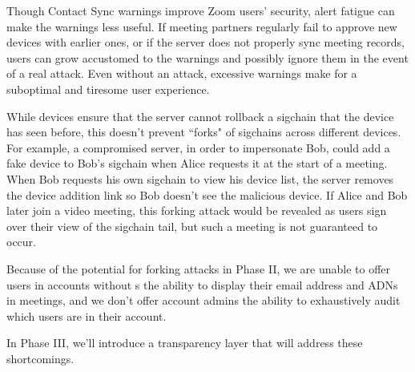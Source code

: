 Though Contact Sync warnings improve Zoom users' security, alert fatigue can make the warnings less
useful. If meeting partners regularly fail to approve new devices with earlier ones, or if the
server does not properly sync meeting records, users can grow accustomed to the warnings and possibly
ignore them in the event of a real attack. Even without an attack, excessive warnings make for a
suboptimal and tiresome user experience.

While devices ensure that the server cannot rollback a sigchain that the device has seen before,
this doesn't prevent ``forks" of sigchains across different devices. For example, a compromised
server, in order to impersonate Bob, could add a fake device to Bob's sigchain when Alice requests
it at the start of a meeting. When Bob requests his own sigchain to view his device list, the server
removes the device addition link so Bob doesn't see the malicious device. If Alice and Bob later
join a video meeting, this forking attack would be revealed as users sign over their view of the
sigchain tail, but such a meeting is not guaranteed to occur.

Because of the potential for forking attacks in Phase II, we are unable to offer users in accounts
without {\idp}s the ability to display their email address and ADNs in meetings, and we don't offer
account admins the ability to exhaustively audit which users are in their account.

In Phase III, we'll introduce a transparency layer that will address these shortcomings.
